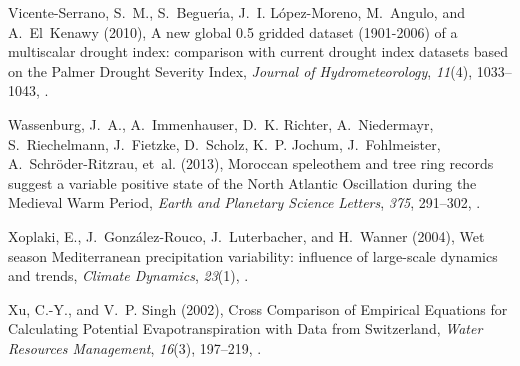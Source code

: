 \documentclass[draft,jgr]{AGUTeX}
\begin{document}
\begin{article}
\begin{thebibliography}{74}
Vicente-Serrano, S.~M., S.~Beguer{\'\i}a, J.~I. L{\'o}pez-Moreno, M.~Angulo,
  and A.~El~Kenawy (2010), {A new global 0.5 gridded dataset (1901-2006) of a
  multiscalar drought index: comparison with current drought index datasets
  based on the Palmer Drought Severity Index}, \textit{Journal of
  Hydrometeorology}, \textit{11}(4), 1033--1043,
  .

Wassenburg, J.~A., A.~Immenhauser, D.~K. Richter, A.~Niedermayr,
  S.~Riechelmann, J.~Fietzke, D.~Scholz, K.~P. Jochum, J.~Fohlmeister,
  A.~Schr{\"o}der-Ritzrau, et~al. (2013), {Moroccan speleothem and tree ring
  records suggest a variable positive state of the North Atlantic Oscillation
  during the Medieval Warm Period}, \textit{Earth and Planetary Science
  Letters}, \textit{375}, 291--302, .

Xoplaki, E., J.~Gonz\'alez-Rouco, J.~Luterbacher, and H.~Wanner (2004), {Wet
  season Mediterranean precipitation variability: influence of large-scale
  dynamics and trends}, \textit{Climate Dynamics}, \textit{23}(1),
  .

Xu, C.-Y., and V.~P. Singh (2002), {Cross Comparison of Empirical Equations for
  Calculating Potential Evapotranspiration with Data from Switzerland},
  \textit{Water Resources Management}, \textit{16}(3), 197--219,
  .

\end{thebibliography}









\end{article}
\end{document}
